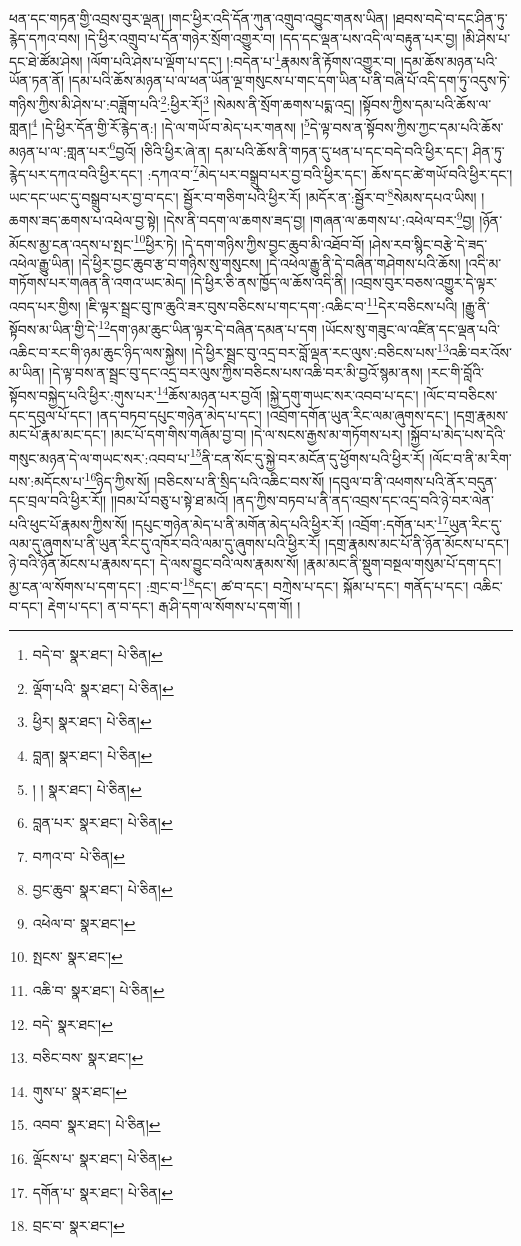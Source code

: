 ཕན་དང་གཏན་གྱི་འབྲས་བུར་ལྡན། །གང་ཕྱིར་འདི་དོན་ཀུན་འགྲུབ་འབྱུང་གནས་ཡིན། །ཐབས་བདེ་བ་དང་ཤིན་ཏུ་རྙེད་དཀའ་བས། །དེ་ཕྱིར་འགྲུབ་པ་དོན་གཉེར་སྲོག་འགྱུར་བ། །དད་དང་ལྡན་པས་འདི་ལ་བརྟུན་པར་བྱ། །མི་ཤེས་པ་དང་ཐེ་ཚོམ་ཤེས། །ལོག་པའི་ཤེས་པ་ལྡོག་པ་དང་། །:བདེན་པ་\footnote{བདེ་བ་  སྣར་ཐང་།  པེ་ཅིན། }རྣམས་ནི་རྟོགས་འགྱུར་བ། །དམ་ཆོས་མཉན་པའི་ཡོན་ཏན་ནོ། །དམ་པའི་ཆོས་མཉན་པ་ལ་ཕན་ཡོན་ལྔ་གསུངས་པ་གང་དག་ཡིན་པ་ནི་བཞི་པོ་འདི་དག་ཏུ་འདུས་ཏེ་གཉིས་ཀྱིས་མི་ཤེས་པ་:བཟློག་པའི་\footnote{ལྡོག་པའི་  སྣར་ཐང་།  པེ་ཅིན། }:ཕྱིར་རོ།\footnote{ཕྱིར།  སྣར་ཐང་།  པེ་ཅིན། } །སེམས་ནི་སྲོག་ཆགས་པདྨ་འདྲ། །སྟོབས་ཀྱིས་དམ་པའི་ཆོས་ལ་གླན།\footnote{བླན།  སྣར་ཐང་།  པེ་ཅིན། } །དེ་ཕྱིར་དོན་གྱི་རོ་རྙེད་ན:། །དེ་ལ་གཡོ་བ་མེད་པར་གནས། །\footnote{། །  སྣར་ཐང་།  པེ་ཅིན། }དེ་ལྟ་བས་ན་སྟོབས་ཀྱིས་ཀྱང་དམ་པའི་ཆོས་མཉན་པ་ལ་:གླན་པར་\footnote{བླན་པར་  སྣར་ཐང་།  པེ་ཅིན། }བྱའོ། །ཅིའི་ཕྱིར་ཞེ་ན། དམ་པའི་ཆོས་ནི་གཏན་དུ་ཕན་པ་དང་བདེ་བའི་ཕྱིར་དང་། ཤིན་ཏུ་རྙེད་པར་དཀའ་བའི་ཕྱིར་དང་། :དཀའ་བ་\footnote{བཀའ་བ་  པེ་ཅིན། }མེད་པར་བསྒྲུབ་པར་བྱ་བའི་ཕྱིར་དང་། ཆོས་དང་ཚེ་གཡོ་བའི་ཕྱིར་དང་། ཡང་དང་ཡང་དུ་བསྒྲུབ་པར་བྱ་བ་དང་། སྦྱོར་བ་གཅིག་པའི་ཕྱིར་རོ། །མདོར་ན་:སྦྱོར་བ་\footnote{བྱང་ཆུབ་  སྣར་ཐང་།  པེ་ཅིན། }སེམས་དཔའ་ཡིས། །ཆགས་ཟད་ཆགས་པ་འཕེལ་བྱ་སྟེ། །དེས་ནི་བདག་ལ་ཆགས་ཟད་བྱ། །གཞན་ལ་ཆགས་པ་:འཕེལ་བར་\footnote{འཕེལ་བ་  སྣར་ཐང་། }བྱ། །ཉོན་མོངས་མྱ་ངན་འདས་པ་སྤང་\footnote{སྤངས་  སྣར་ཐང་། }ཕྱིར་ཏེ། །དེ་དག་གཉིས་ཀྱིས་བྱང་ཆུབ་མི་འཐོབ་བོ། །ཤེས་རབ་སྙིང་བརྩེ་དེ་ཟད་འཕེལ་རྒྱུ་ཡིན། །དེ་ཕྱིར་བྱང་ཆུབ་རྩ་བ་གཉིས་སུ་གསུངས། །དེ་འཕེལ་རྒྱུ་ནི་དེ་བཞིན་གཤེགས་པའི་ཆོས། །འདི་མ་གཏོགས་པར་གཞན་ནི་འགའ་ཡང་མེད། །དེ་ཕྱིར་ཅི་ནས་ཁྱོད་ལ་ཆོས་འདི་ནི། །འབྲས་བུར་བཅས་འགྱུར་དེ་ལྟར་འབད་པར་གྱིས། །ཇི་ལྟར་སྦྲང་བུ་ཁ་ཆུའི་ཟར་བུས་བཅིངས་པ་གང་དག་:འཆིང་བ་\footnote{འཆི་བ་  སྣར་ཐང་།  པེ་ཅིན། }དེར་བཅིངས་པའི། །རྒྱུ་ནི་སྟོབས་མ་ཡིན་གྱི་དེ་\footnote{བདེ་  སྣར་ཐང་། }དག་ཉམ་ཆུང་ཡིན་ལྟར་དེ་བཞིན་དམན་པ་དག །ཡོངས་སུ་གཟུང་ལ་འཛིན་དང་ལྡན་པའི་འཆིང་བ་རང་གི་ཉམ་ཆུང་ཉིད་ལས་སྐྱེས། །དེ་ཕྱིར་སྦྲང་བུ་འདྲ་བར་བློ་ལྡན་རང་ལུས་:བཅིངས་པས་\footnote{བཅིང་བས་  སྣར་ཐང་། }འཆི་བར་འོས་མ་ཡིན། །དེ་ལྟ་བས་ན་སྦྲང་བུ་དང་འདྲ་བར་ལུས་ཀྱིས་བཅིངས་པས་འཆི་བར་མི་བྱའོ་སྙམ་ནས། །རང་གི་བློའི་སྟོབས་བསྐྱེད་པའི་ཕྱིར་:གུས་པར་\footnote{གུས་པ་  སྣར་ཐང་། }ཆོས་མཉན་པར་བྱའོ། །སྐྱེ་དགུ་གཡང་སར་འབབ་པ་དང་། །ལོང་བ་བཅིངས་དང་དབུལ་པོ་དང་། །ནད་བཏབ་དཔུང་གཉེན་མེད་པ་དང་། །འབྲོག་དགོན་ཡུན་རིང་ལམ་ཞུགས་དང་། །དགྲ་རྣམས་མང་པོ་རྣམ་མང་དང་། །མང་པོ་དག་གིས་གཞོམ་བྱ་བ། །དེ་ལ་སངས་རྒྱས་མ་གཏོགས་པར། །སྐྱོབ་པ་མེད་པས་དེའི་གསུང་མཉན་དེ་ལ་གཡང་སར་:འབབ་པ་\footnote{འབབ་  སྣར་ཐང་།  པེ་ཅིན། }ནི་ངན་སོང་དུ་སྐྱེ་བར་མངོན་དུ་ཕྱོགས་པའི་ཕྱིར་རོ། །ལོང་བ་ནི་མ་རིག་པས་:མདོངས་པ་\footnote{ལྡོངས་པ་  སྣར་ཐང་།  པེ་ཅིན། }ཉིད་ཀྱིས་སོ། །བཅིངས་པ་ནི་སྲིད་པའི་འཆིང་བས་སོ། །དབུལ་བ་ནི་འཕགས་པའི་ནོར་བདུན་དང་བྲལ་བའི་ཕྱིར་རོ།། །།བམ་པོ་བཅུ་པ་སྟེ་ཐ་མའོ། །ནད་ཀྱིས་བཏབ་པ་ནི་ནད་འབྲས་དང་འདྲ་བའི་ཉེ་བར་ལེན་པའི་ཕུང་པོ་རྣམས་ཀྱིས་སོ། །དཔུང་གཉེན་མེད་པ་ནི་མགོན་མེད་པའི་ཕྱིར་རོ། །འབྲོག་:དགོན་པར་\footnote{དགོན་པ་  སྣར་ཐང་།  པེ་ཅིན། }ཡུན་རིང་དུ་ལམ་དུ་ཞུགས་པ་ནི་ཡུན་རིང་དུ་འཁོར་བའི་ལམ་དུ་ཞུགས་པའི་ཕྱིར་རོ། །དགྲ་རྣམས་མང་པོ་ནི་ཉོན་མོངས་པ་དང་། ཉེ་བའི་ཉོན་མོངས་པ་རྣམས་དང་། དེ་ལས་བྱུང་བའི་ལས་རྣམས་སོ། །རྣམ་མང་ནི་སྡུག་བསྔལ་གསུམ་པོ་དག་དང་། མྱ་ངན་ལ་སོགས་པ་དག་དང་། :གྲང་བ་\footnote{བྲང་བ་  སྣར་ཐང་། }དང་། ཚ་བ་དང་། བཀྲེས་པ་དང་། སྐོམ་པ་དང་། གནོད་པ་དང་། འཆིང་བ་དང་། རྡེག་པ་དང་། ན་བ་དང་། རྒ་ཤི་དག་ལ་སོགས་པ་དག་གོ། །
